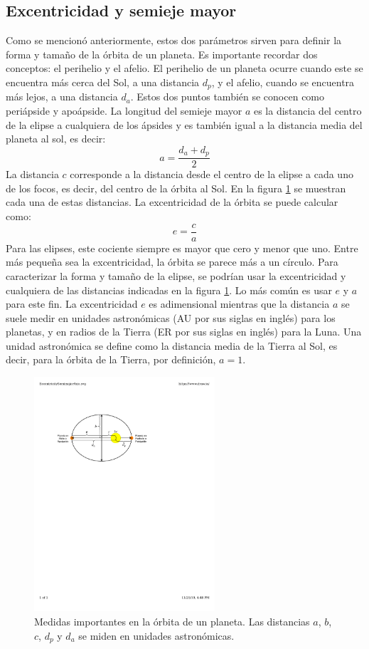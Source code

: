 \documentclass[a4paper,10pt]{article}
\begin{document}
\subsection{Excentricidad y semieje mayor}
Como se mencionó anteriormente, estos dos parámetros sirven para definir la forma y tamaño de la órbita de un planeta. Es importante recordar dos conceptos: el perihelio y el afelio. El perihelio de un planeta ocurre cuando este se encuentra más cerca del Sol, a una distancia $d_p$, y el afelio, cuando se encuentra más lejos, a una distancia $d_a$. Estos dos puntos también se conocen como periápside y apoápside. La longitud del semieje mayor $a$ es la distancia del centro de la elipse a cualquiera de los ápsides y es también igual a la distancia media del planeta al sol, es decir:
\[a = \frac{d_a + d_p}{2}\]
La distancia $c$ corresponde a la distancia desde el centro de la elipse a cada uno de los focos, es decir, del centro de la órbita al Sol. En la figura \ref{fig:Ellipse} se muestran cada una de estas distancias. La excentricidad de la órbita se puede calcular como:
\begin{equation}
  e = \frac{c}{a}
\end{equation}
Para las elipses, este cociente siempre es mayor que cero y menor que uno. Entre más pequeña sea la excentricidad, la órbita se parece más a un círculo. Para caracterizar la forma y tamaño de la elipse, se podrían usar la excentricidad y cualquiera de las distancias indicadas en la figura \ref{fig:Ellipse}. Lo más común es usar $e$ y $a$ para este fin. La excentricidad $e$ es adimensional mientras que la distancia $a$ se suele medir en unidades astronómicas (AU por sus siglas en inglés) para los planetas, y en radios de la Tierra (ER por sus siglas en inglés) para la Luna. Una unidad astronómica se define como la distancia media de la Tierra al Sol, es decir, para la órbita de la Tierra, por definición, $a=1$.
\begin{figure}
  \centering
  \includegraphics[width=0.6\textwidth]{Figures/EccentricitySemimajorAxis.pdf}
  \caption{Medidas importantes en la órbita de un planeta. Las distancias $a$, $b$, $c$, $d_p$ y $d_a$ se miden en unidades astronómicas.}
  \label{fig:Ellipse}
\end{figure}
\end{document}
